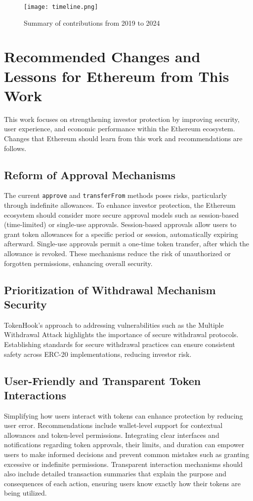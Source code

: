 \begin{figure}[t]
	\centering
	\texttt{[image: timeline.png]}
	\caption[Contributions summary]{Summary of contributions from 2019 to 2024}
	\label{fig:timeline}
\end{figure}

\section{Recommended Changes and Lessons for Ethereum from This Work}
This work focuses on strengthening investor protection by improving security, user experience, and economic performance within the Ethereum ecosystem. Changes that Ethereum should learn from this work and recommendations are follows.

\subsection{Reform of Approval Mechanisms}
The current \texttt{approve} and \texttt{transferFrom} methods poses risks, particularly through indefinite allowances. To enhance investor protection, the Ethereum ecosystem should consider more secure approval models such as session-based (time-limited) or single-use approvals. Session-based approvals allow users to grant token allowances for a specific period or session, automatically expiring afterward. Single-use approvals permit a one-time token transfer, after which the allowance is revoked. These mechanisms reduce the risk of unauthorized or forgotten permissions, enhancing overall security.

\subsection{Prioritization of Withdrawal Mechanism Security}
TokenHook's approach to addressing vulnerabilities such as the Multiple Withdrawal Attack highlights the importance of secure withdrawal protocols. Establishing standards for secure withdrawal practices can ensure consistent safety across ERC-20 implementations, reducing investor risk.

\subsection{User-Friendly and Transparent Token Interactions}
Simplifying how users interact with tokens can enhance protection by reducing user error. Recommendations include wallet-level support for contextual allowances and token-level permissions. Integrating clear interfaces and notifications regarding token approvals, their limits, and duration can empower users to make informed decisions and prevent common mistakes such as granting excessive or indefinite permissions. Transparent interaction mechanisms should also include detailed transaction summaries that explain the purpose and consequences of each action, ensuring users know exactly how their tokens are being utilized. 


